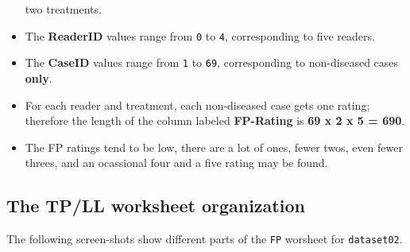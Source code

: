\documentclass[]{book}
\begin{document}
\begin{itemize}
 two treatments.
\item
  The \textbf{ReaderID} values range from \texttt{0} to \texttt{4}, corresponding to five readers.
\item
  The \textbf{CaseID} values range from \texttt{1} to \texttt{69}, corresponding to non-diseased cases \textbf{only}.
\item
  For each reader and treatment, each non-diseased case gets one rating; therefore the length of the column labeled \textbf{FP-Rating} is \textbf{69 x 2 x 5 = 690}.
\item
  The FP ratings tend to be low, there are a lot of ones, fewer twos, even fewer threes, and an ocassional four and a five rating may be found.
\end{itemize}

\hypertarget{the-tpll-worksheet-organization}{%
\subsection{The TP/LL worksheet organization}\label{the-tpll-worksheet-organization}}

The following screen-shots show different parts of the \texttt{FP} worsheet for \texttt{dataset02}.
\end{document}
